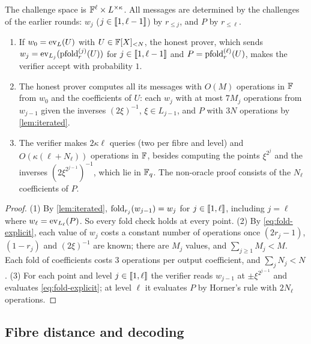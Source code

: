 \begin{remark}
The challenge space is $\mathbb{F}^{\ell} \times L^{\times\kappa}$. All messages are determined by the challenges of the earlier rounds: $w_{j}$ ($j \in \llbracket 1, \ell-1 \rrbracket$) by $r_{\le j}$, and $P$ by $r_{\le \ell}$.
\end{remark}

\begin{lemma}\label{lem:fpt-complete}
\begin{enumerate}
  \item If $w_0 = \mathrm{ev}_L(U)$ with $U \in \mathbb{F}[X]_{<N}$, the honest prover, which sends $w_j = \mathrm{ev}_{L_j}(\mathrm{pfold}^{(j)}_r(U))$ for $j \in \llbracket 1, \ell-1 \rrbracket$ and $P = \mathrm{pfold}^{(\ell)}_r(U)$, makes the verifier accept with probability $1$.
  \item The honest prover computes all its messages with $O(M)$ operations in $\mathbb{F}$ from $w_0$ and the coefficients of $U$: each $w_j$ with at most $7M_j$ operations from $w_{j-1}$ given the inverses $(2\xi)^{-1}$, $\xi \in L_{j-1}$, and $P$ with $3N$ operations by \cref{lem:iterated}.
  \item The verifier makes $2\kappa\ell$ queries (two per fibre and level) and $O(\kappa(\ell + N_\ell))$ operations in $\mathbb{F}$, besides computing the points $\xi^{2^j}$ and the inverses $(2\xi^{2^{j-1}})^{-1}$, which lie in $\mathbb{F}_q$. The non-oracle proof consists of the $N_\ell$ coefficients of $P$.
\end{enumerate}
\end{lemma}

\begin{proof}
(1) By \cref{lem:iterated}, $\mathrm{fold}_{r_j}(w_{j-1}) = w_j$ for $j \in \llbracket 1, \ell \rrbracket$, including $j = \ell$ where $w_\ell = \mathrm{ev}_{L_\ell}(P)$. So every fold check holds at every point.
(2) By \eqref{eq:fold-explicit}, each value of $w_j$ costs a constant number of operations once $(2r_j - 1)$, $(1-r_j)$ and $(2\xi)^{-1}$ are known; there are $M_j$ values, and $\sum_{j \ge 1} M_j < M$. Each fold of coefficients costs $3$ operations per output coefficient, and $\sum_j N_j < N$.
(3) For each point and level $j \in \llbracket 1, \ell \rrbracket$ the verifier reads $w_{j-1}$ at $\pm\xi^{2^{j-1}}$ and evaluates \eqref{eq:fold-explicit}; at level $\ell$ it evaluates $P$ by Horner's rule with $2N_\ell$ operations.
\end{proof}

\subsection{Fibre distance and decoding}\label{sec:fold:decode}


